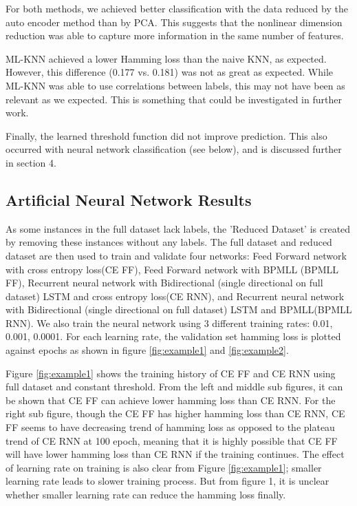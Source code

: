 \documentclass[11pt]{article}
\begin{document}
For both methods, we achieved better classification with the data reduced by the auto encoder method than by PCA. This suggests that the nonlinear dimension reduction was able to capture more information in the same number of features. 

ML-KNN achieved a lower Hamming loss than the naive KNN, as expected. However, this difference (0.177 vs. 0.181) was not as great as expected. While ML-KNN was able to use correlations between labels, this may not have been as relevant as we expected. This is something that could be investigated in further work. 

Finally, the learned threshold function did not improve prediction. This also occurred with neural network classification (see below), and is discussed further in section 4. 

\subsection{Artificial Neural Network Results}

As some instances in the full dataset lack labels,  the 'Reduced Dataset' is created by removing these instances without any labels. The full dataset and reduced dataset are then used to train and validate four networks: Feed Forward network with cross entropy loss(CE FF), Feed Forward network with BPMLL (BPMLL FF), Recurrent neural network with Bidirectional (single directional on full dataset) LSTM and  cross entropy loss(CE RNN), and Recurrent neural network with Bidirectional (single directional on full dataset) LSTM and BPMLL(BPMLL RNN). We also train the neural network using 3 different training rates: 0.01, 0.001, 0.0001. For each learning rate, the validation set hamming loss is plotted against epochs as shown in figure \ref{fig:example1} and \ref{fig:example2}.

Figure \ref{fig:example1} shows the training history of CE FF and CE RNN using full dataset and constant threshold. From the left and middle sub figures, it can be shown that CE FF can achieve lower hamming loss than CE RNN. For the right sub figure, though the CE FF has higher hamming loss than CE RNN, CE FF seems to have decreasing trend of hamming loss as opposed to the plateau trend of CE RNN at 100 epoch, meaning that it is highly possible that CE FF will have lower hamming loss than CE RNN if the training continues. The effect of learning rate on training is also clear from Figure \ref{fig:example1}; smaller learning rate leads to slower training process. But from figure 1, it is unclear whether  smaller learning rate can reduce the hamming loss finally.
\end{document}
